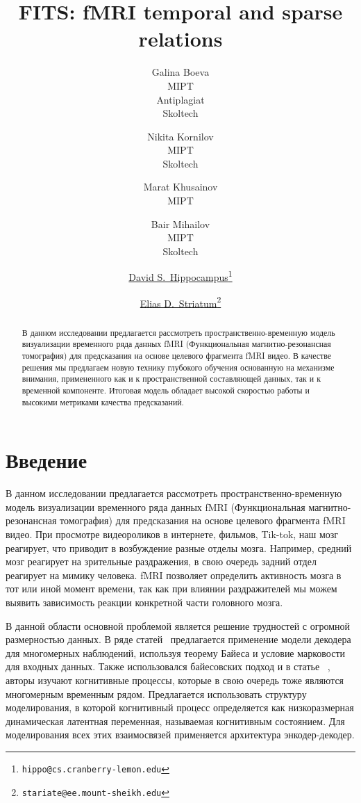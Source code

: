 \documentclass{article}
\title{FITS: fMRI temporal and sparse relations}
\author{Galina Boeva \\
	MIPT\\
	Antiplagiat\\
	  Skoltech \\
 \and Nikita Kornilov \\
 MIPT \\
 Skoltech
 \and Marat Khusainov \\
 MIPT 
 \and Bair Mihailov \\
 MIPT\\
 Skoltech
}
\author[1]{%
	\href{https://orcid.org/0000-0000-0000-0000}{\usebox{\orcid}\hspace{1mm}David S.~Hippocampus\thanks{\texttt{hippo@cs.cranberry-lemon.edu}}}%
}
\author[1,2]{%
	\href{https://orcid.org/0000-0000-0000-0000}{\usebox{\orcid}\hspace{1mm}Elias D.~Striatum\thanks{\texttt{stariate@ee.mount-sheikh.edu}}}%
}
\affil[1]{}
\affil[2]{}
\begin{document}
\maketitle

\begin{abstract}
В данном исследовании предлагается рассмотреть пространственно-временную модель визуализации временного ряда данных fMRI (Функциональная магнитно-резонансная томография) для предсказания на основе целевого фрагмента fMRI видео. В качестве решения мы предлагаем новую технику глубокого обучения основанную на механизме внимания, примененного как и к пространственной составляющей данных, так и к временной компоненте. Итоговая модель обладает высокой скоростью  работы и высокими метриками качества предсказаний.      
\end{abstract}




\section{Введение}

В данном исследовании предлагается рассмотреть пространственно-временную модель визуализации временного ряда данных fMRI (Функциональная магнитно-резонансная томография) для предсказания на основе целевого фрагмента fMRI видео. При просмотре видеороликов в интернете, фильмов, Tik-tok, наш мозг реагирует, что приводит в возбуждение разные отделы мозга. Например, средний мозг реагирует на зрительные раздражения, в свою очередь задний отдел реагирует на мимику человека. fMRI позволяет определить активность мозга в тот или иной момент времени, так как при влиянии раздражителей мы можем выявить зависимость реакции конкретной части головного мозга.

В данной области основной проблемой является решение трудностей с огромной размерностью данных. В ряде статей~\cite{ rezaei2023deep, rezaei2020bayesian} предлагается применение модели декодера для  многомерных наблюдений, используя теорему Байеса и условие марковости для входных данных. Также использовался байесовских подход и в статье ~\cite{yousefi2019decoding}, авторы изучают когнитивные процессы, которые в свою очередь тоже являются многомерным временным рядом. Предлагается использовать структуру моделирования, в которой когнитивный процесс определяется как низкоразмерная динамическая латентная переменная, называемая когнитивным состоянием. Для моделирования всех этих взаимосвязей применяется архитектура энкодер-декодер. 
\end{document}
